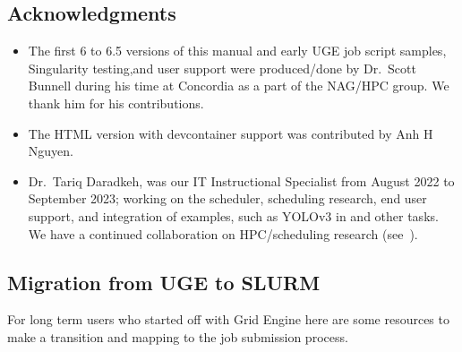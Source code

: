 
\subsection{Acknowledgments}
\label{sect:acks}

\begin{itemize}
	\item
    The first 6 to 6.5 versions of this manual and early UGE job script samples, Singularity testing,and user support
    were produced/done by Dr.~Scott Bunnell during his time at Concordia as a part of the NAG/HPC group.
    We thank him for his contributions.
	\item
    The HTML version with devcontainer support was contributed by Anh H Nguyen.
	\item
    Dr.~Tariq Daradkeh, was our IT Instructional Specialist from August 2022 to September 2023;
    working on the scheduler, scheduling research, end user support, and integration of
    examples, such as YOLOv3 in  and other tasks. We have a continued
    collaboration on HPC/scheduling research (see~\cite{job-failure-prediction-compsysarch2024}).
\end{itemize}

\subsection{Migration from UGE to SLURM}
\label{appdx:uge-to-slurm}

For long term users who started off with Grid Engine here are some resources
to make a transition and mapping to the job submission process.


